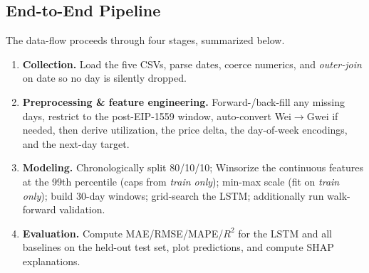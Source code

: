 \documentclass[11pt,a4paper]{article}
\begin{document}
\subsection{End-to-End Pipeline}
The data-flow proceeds through four stages, summarized below.

\begin{enumerate}[leftmargin=1.4em]
\item \textbf{Collection.} Load the five CSVs, parse dates, coerce numerics, and \emph{outer-join}
on date so no day is silently dropped.
\item \textbf{Preprocessing \& feature engineering.} Forward-/back-fill any missing days,
restrict to the post-EIP-1559 window, auto-convert Wei$\to$Gwei if needed, then derive
utilization, the price delta, the day-of-week encodings, and the next-day target.
\item \textbf{Modeling.} Chronologically split 80/10/10; Winsorize the continuous features at the
99th percentile (caps from \emph{train only}); min-max scale (fit on \emph{train only}); build
30-day windows; grid-search the LSTM; additionally run walk-forward validation.
\item \textbf{Evaluation.} Compute MAE/RMSE/MAPE/$R^2$ for the LSTM and all baselines on the
held-out test set, plot predictions, and compute SHAP explanations.
\end{enumerate}
\end{document}
